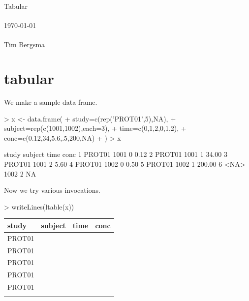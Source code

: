 \documentclass[titlepage]{article}
\begin{document}
\vspace*{2cm}
\begin{center}
\vspace{1.5cm}
{\Large Tabular}\\
~\\
\today\\
~\\
Tim Bergsma\\
\end{center}
\newpage
\section*{tabular}
We make a sample data frame.
\begin{Schunk}
\begin{Sinput}
> x <- data.frame(
+   study=c(rep('PROT01',5),NA),
+   subject=rep(c(1001,1002),each=3),
+   time=c(0,1,2,0,1,2),
+   conc=c(0.12,34,5.6,.5,200,NA)
+ )
> x
\end{Sinput}
\begin{Soutput}
   study subject time   conc
1 PROT01    1001    0   0.12
2 PROT01    1001    1  34.00
3 PROT01    1001    2   5.60
4 PROT01    1002    0   0.50
5 PROT01    1002    1 200.00
6   <NA>    1002    2     NA
\end{Soutput}
\end{Schunk}
Now we try various invocations.
\begin{Schunk}
\begin{Sinput}
> writeLines(ltable(x))
\end{Sinput}
\begin{table}[!htpb]
 \begin{center}
  \begin{tabular}{lrrr}
    \hline \hline
   study & subject & time & conc \\ \hline
   PROT01 & \verb#1001# & \verb#0# & \verb#0.12# \\
   PROT01 & \verb#1001# & \verb#1# & \verb#34.00# \\
   PROT01 & \verb#1001# & \verb#2# & \verb#5.60# \\
   PROT01 & \verb#1002# & \verb#0# & \verb#0.50# \\
   PROT01 & \verb#1002# & \verb#1# & \verb#200.00# \\
    & \verb#1002# & \verb#2# & \verb## \\ \hline
  \end{tabular}
 \end{center}
\end{table}\end{Schunk}
\end{document}
